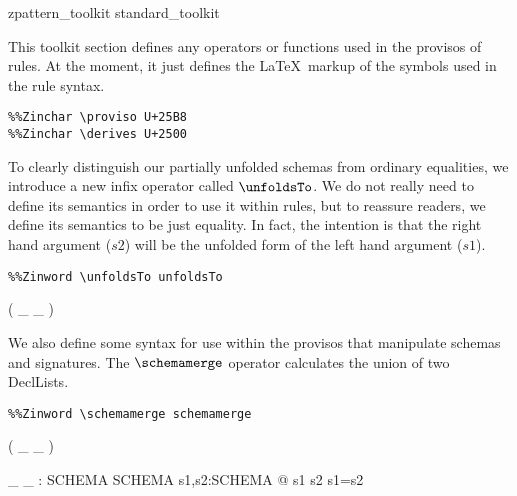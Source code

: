\begin{zsection}
  \SECTION zpattern\_toolkit \parents standard\_toolkit
\end{zsection}

This toolkit section defines any operators or functions used in the
provisos of rules.  At the moment, it just defines the \LaTeX\ markup
of the symbols used in the rule syntax.

\begin{verbatim}
%%Zinchar \proviso U+25B8
%%Zinchar \derives U+2500
\end{verbatim}

To clearly distinguish our partially unfolded schemas from ordinary
equalities, we introduce a new infix operator called $\unfoldsTo$.  We
do not really need to define its semantics in order to use it within
rules, but to reassure readers, we define its semantics to be just
equality.  In fact, the intention is that the right hand argument
($s2$) will be the unfolded form of the left hand argument ($s1$).

\begin{verbatim}
%%Zinword \unfoldsTo unfoldsTo
\end{verbatim}

\begin{zed}
  \relation ( \_ \unfoldsTo \_ )
\end{zed}

We also define some syntax for use within the provisos that manipulate
schemas and signatures.  The $\schemamerge$ operator calculates
the union of two DeclLists. 
\begin{verbatim}
%%Zinword \schemamerge schemamerge
\end{verbatim}

\begin{zed}
   \leftassoc ( \_ \schemamerge \_ )
\end{zed}

\begin{gendef}[SCHEMA]
  \_ \unfoldsTo \_ : SCHEMA \rel SCHEMA
\where
  \forall s1,s2:SCHEMA @ s1 \unfoldsTo s2 \iff s1=s2
\end{gendef}
